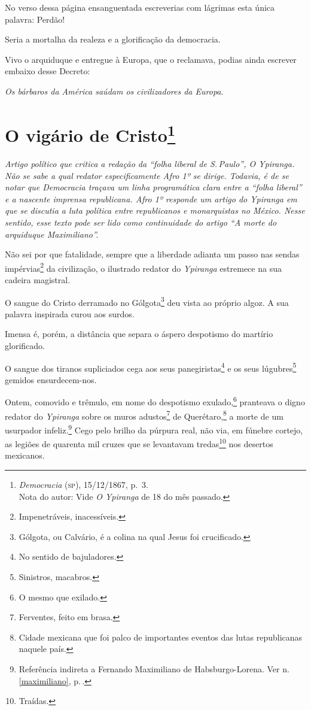 No verso dessa página ensanguentada escreverias com lágrimas esta única
palavra: Perdão!

Seria a mortalha da realeza e a glorificação da democracia.

Vivo o arquiduque e entregue à Europa, que o reclamava, podias ainda
escrever embaixo desse Decreto:

\emph{Os bárbaros da América saúdam os civilizadores da Europa}.

\chapter{O vigário de Cristo\footnote{\emph{Democracia} (\textsc{sp}),
  15/12/1867, p.~3.\\
  Nota do autor: Vide \emph{O Ypiranga} de 18 do mês passado.}}

\begin{didascalia}\itshape
Artigo político que critica a redação da ``folha liberal de S.\,Paulo'', \textnormal{O Ypiranga}. Não se sabe a qual redator
especificamente Afro 1º se dirige. Todavia, é de se notar que
\textnormal{Democracia} traçava um linha programática clara entre a ``folha
liberal'' e a nascente imprensa republicana. Afro 1º
responde um artigo do \textnormal{Ypiranga} em que se discutia a luta
política entre republicanos e monarquistas no México. Nesse sentido,
esse texto pode ser lido como continuidade do artigo ``A morte do
arquiduque Maximiliano''.
\end{didascalia}



Não sei por que fatalidade, sempre que a liberdade adianta um passo nas
sendas impérvias\footnote{Impenetráveis, inacessíveis.} da
civilização, o ilustrado redator do \emph{Ypiranga} estremece na sua
cadeira magistral.

O sangue do Cristo derramado no Gólgota\footnote{Gólgota, ou Calvário,
  é a colina na qual Jesus foi crucificado.} deu vista ao próprio algoz.
A sua palavra inspirada curou aos surdos.

Imensa é, porém, a distância que separa o áspero despotismo do martírio
glorificado.

O sangue dos tiranos supliciados cega aos seus panegiristas\footnote{
  No sentido de bajuladores.} e os seus lúgubres\footnote{Sinistros,
  macabros.} gemidos ensurdecem-nos.

Ontem, comovido e trêmulo, em nome do despotismo exulado,\footnote{O
  mesmo que exilado.} pranteava o digno redator do \emph{Ypiranga}
sobre os muros adustos\footnote{Ferventes, feito em brasa.} de
Querétaro,\footnote{Cidade mexicana que foi palco de importantes
  eventos das lutas republicanas naquele país.} a morte de um usurpador
infeliz.\footnote{Referência indireta a Fernando Maximiliano de
  Habsburgo-Lorena. Ver n.\,\ref{maximiliano}, p.\,\pageref{maximiliano}.} Cego pelo brilho da púrpura real, não via, em fúnebre
cortejo, as legiões de quarenta mil cruzes que se levantavam
tredas\footnote{Traídas.} nos desertos mexicanos.

